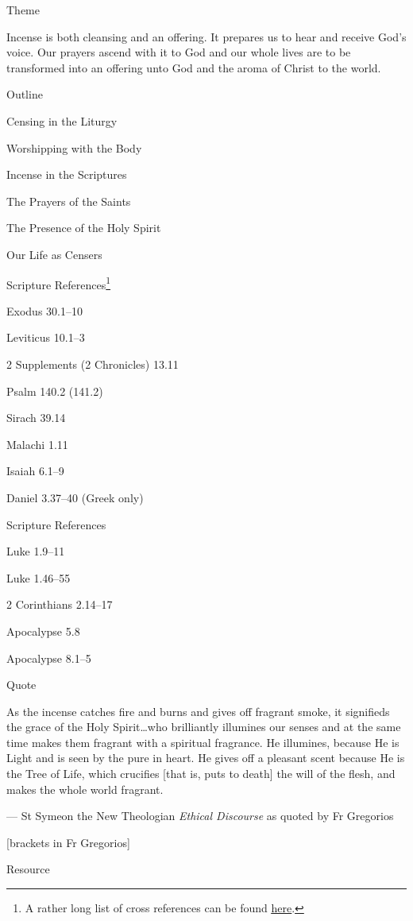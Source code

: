 \documentclass[
]{article}
\begin{document}
Theme

Incense is both cleansing and an offering. It prepares us to hear and
receive God's voice. Our prayers ascend with it to God and our whole
lives are to be transformed into an offering unto God and the aroma of
Christ to the world.

Outline

Censing in the Liturgy

Worshipping with the Body

Incense in the Scriptures

The Prayers of the Saints

The Presence of the Holy Spirit

Our Life as Censers

Scripture References\footnote{A rather long list of cross references can
  be found
  \href{http://jimmyakin.com/deuterocanonical-references-in-the-new-testament}{\ul{here}}.}

Exodus 30.1--10

Leviticus 10.1--3

2 Supplements (2 Chronicles) 13.11

Psalm 140.2 (141.2)

Sirach 39.14

Malachi 1.11

Isaiah 6.1--9

Daniel 3.37--40 (Greek only)

Scripture References

Luke 1.9--11

Luke 1.46--55

2 Corinthians 2.14--17

Apocalypse 5.8

Apocalypse 8.1--5

Quote

As the incense catches fire and burns and gives off fragrant smoke, it
signifieds the grace of the Holy Spirit\ldots who brilliantly illumines
our senses and at the same time makes them fragrant with a spiritual
fragrance. He illumines, because He is Light and is seen by the pure in
heart. He gives off a pleasant scent because He is the Tree of Life,
which crucifies {[}that is, puts to death{]} the will of the flesh, and
makes the whole world fragrant.

--- St Symeon the New Theologian \emph{Ethical Discourse} as quoted by
Fr Gregorios

{[}brackets in Fr Gregorios{]}

Resource
\end{document}
